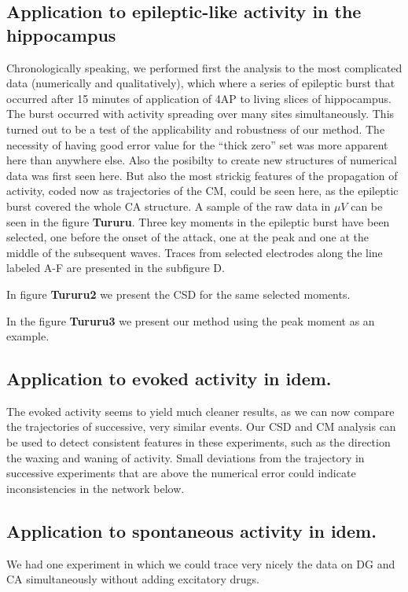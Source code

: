 \documentclass{article}
\begin{document}
\subsection{Application to epileptic-like activity in the hippocampus}
Chronologically speaking, we performed first the analysis to the most complicated data (numerically and qualitatively), which where a series of epileptic burst that occurred after 15 minutes of application of 4AP to living slices of hippocampus. The burst occurred with activity spreading over many sites simultaneously. This turned out to be a test of the applicability and robustness of our method. The necessity of having good error value for the ``thick zero'' set was more apparent here than anywhere else. Also the posibilty to create new structures of numerical data was first seen here.  But also the most strickig features of the propagation of activity, coded now as trajectories of the CM, could be seen here, as the epileptic burst covered the whole CA structure. A sample of the raw data in $\mu V$ can be seen in the figure \textbf{Tururu}. Three key moments in the epileptic burst have been selected, one before the onset of the attack, one at the peak and one at the middle of the subsequent waves. Traces from selected electrodes along the line labeled A-F are presented in the subfigure D. 

In figure \textbf{Tururu2} we present the CSD for the same selected moments.

In the figure \textbf{Tururu3} we present our method using the peak moment as an example. 


\subsection{Application to evoked activity in idem.}

The evoked activity seems to yield much cleaner results, as we can now compare the trajectories of successive, very similar events. Our CSD and CM analysis can be used to detect consistent features in these experiments, such as the direction the waxing and waning of activity. Small deviations from the trajectory in successive experiments that are above the numerical error could indicate inconsistencies in the network below. 

\subsection{Application to spontaneous activity in idem.}

We had one experiment in which we could trace very nicely the data on DG and CA simultaneously without adding excitatory drugs. 


 
\end{document}

